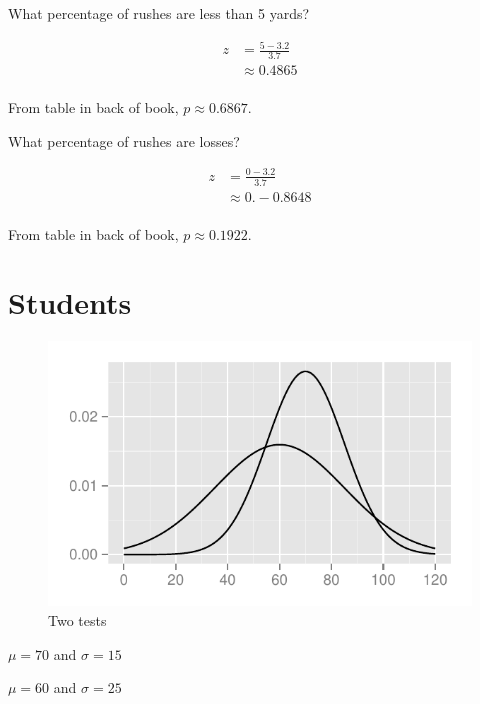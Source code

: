 \documentclass[landscape]{exam}
\begin{document}
  \begin{questions}
    \question{} What percentage of rushes are less than 5 yards?
      \begin{solution}
        \begin{align*}
          z & = \frac{5 - 3.2}{3.7} \\
            & \approx 0.4865 \\
        \end{align*}

        From table in back of book, $p \approx 0.6867$.
      \end{solution}

    \question{} What percentage of rushes are losses?
      \begin{solution}
        \begin{align*}
          z & = \frac{0 - 3.2}{3.7} \\
            & \approx 0.-0.8648 \\
        \end{align*}

        From table in back of book, $p \approx 0.1922$.
      \end{solution}

  \end{questions}

  \section{Students}
  \begin{figure}[H]
    \centering
    \includegraphics[scale = 0.9]{figures/two_tests.pdf}
    \caption{Two tests}
  \end{figure}

  \begin{itemize*}
    \item $\mu = 70$ and $\sigma = 15$
    \item $\mu = 60$ and $\sigma = 25$
  \end{itemize*}
\end{document}
